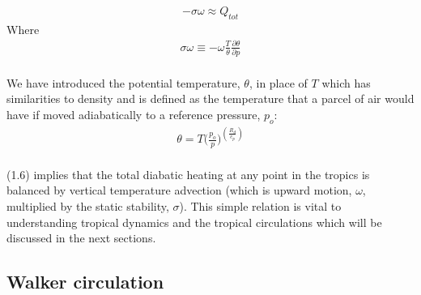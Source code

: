 \documentclass[letterpaper,12pt,titlepage,oneside,final]{book}
\begin{document}
\begin{align}
-\sigma\omega \approx{Q_{tot}}
\end{align}
Where
\begin{align}
  \sigma\omega\equiv-\omega\frac{T}{\theta}\frac{\partial{\theta}}{\partial{p}}
\end{align}
\\
We have introduced the potential temperature, $\theta$, in place of $T$ which has similarities to density and is defined as the temperature that a parcel of air would have if moved adiabatically to a reference pressure, $p_{o}$:
\begin{align}
\theta=T\Big(\frac{p_{o}}{p}\Big)^{(\frac{R_{d}}{c_{p}})}
\end{align}
\\
(1.6) implies that the total diabatic heating at any point in the tropics is balanced by vertical temperature advection (which is upward motion, $\omega$, multiplied by the static stability, $\sigma$).
This simple relation is vital to understanding tropical dynamics and the tropical circulations which will be discussed in the next sections.

\subsection{Walker circulation}
\end{document}
